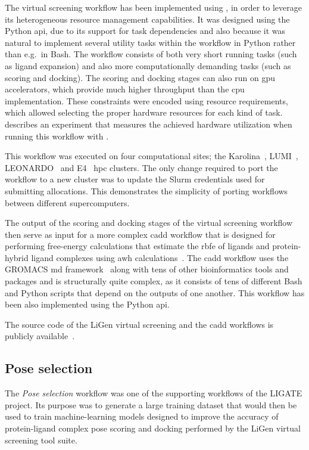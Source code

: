The virtual screening workflow has been implemented using \hyperqueue{}, in order to
leverage its heterogeneous resource management capabilities. It was designed using the Python
\gls{api}, due to its support for task dependencies and also because it was natural
to implement several utility tasks within the workflow in Python rather than e.g.\ in Bash. The
workflow consists of both very short running tasks (such as ligand expansion) and also more
computationally demanding tasks (such as scoring and docking). The scoring and docking stages can
also run on \gls{gpu} accelerators, which provide much higher throughput than the
\gls{cpu} implementation. These constraints were encoded using
\hq{} resource requirements, which allowed selecting the proper hardware
resources for each kind of task.  describes an experiment that measures the
achieved hardware utilization when running this workflow with \hyperqueue{}.

This workflow was executed on four computational sites; the Karolina~\cite{karolina},
LUMI~\cite{lumi}, LEONARDO~\cite{leonardo} and E4~\cite{e4}
\gls{hpc} clusters. The only change required to port the workflow to a new cluster
was to update the Slurm credentials used for submitting allocations. This demonstrates the
simplicity of porting \hyperqueue{} workflows between different supercomputers.

The output of the scoring and docking stages of the virtual screening workflow then serve as input
for a more complex \gls{cadd} workflow that is designed for performing free-energy
calculations that estimate the \gls{rbfe} of ligands and protein-hybrid ligand
complexes using \gls{awh} calculations~\cite{awh}. The
\gls{cadd} workflow uses the GROMACS \gls{md}
framework~\cite{gromacs} along with tens of other bioinformatics tools and packages and is
structurally quite complex, as it consists of tens of different Bash and Python scripts that depend
on the outputs of one another. This workflow has been also implemented using the
\hyperqueue{} Python \gls{api}.

The source code of the LiGen virtual screening and the \gls{cadd} workflows is
publicly available~\cite{cadd-workflow}.

\subsection{Pose selection}
The \emph{Pose selection} workflow was one of the supporting workflows of the LIGATE project. Its
purpose was to generate a large training dataset that would then be used to train machine-learning
models designed to improve the accuracy of protein-ligand complex pose scoring and docking
performed by the LiGen virtual screening tool suite.

